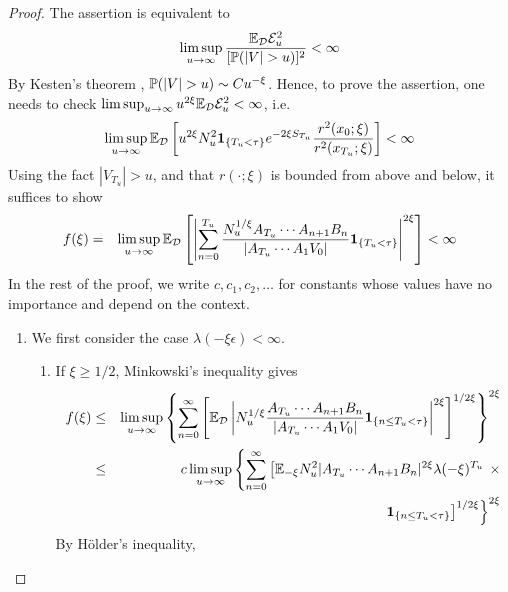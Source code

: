 \documentclass{article}
\theoremstyle{remark}
\begin{document}
\begin{proof}
  The assertion is equivalent to
  \[
  \limsup_{u \to \infty} {\E_{\mathcal D} \mathcal E_u^2 \over [\P(|V|
    > u)]^2} < \infty
  \]
  By Kesten's theorem \cite{Kesten1973}, $\P(|V| > u) \sim C
  u^{-\xi}$. Hence, to prove the assertion, one needs to check
  $\limsup_{u \to \infty} u^{2\xi}\E_{\mathcal D} \mathcal E_u^2 <
  \infty$, i.e.
  \[
  \limsup_{u \to \infty} \E_{\mathcal D}  \left[u^{2\xi}
    N_u^2 \1{T_u < \tau} e^{-2\xi S_{T_u}} {r^2(x_0; \xi)
      \over r^2(x_{T_u}; \xi)}\right] < \infty
 \]
 Using the fact $|V_{T_u}| > u$, and that $r(\cdot; \xi)$ is bounded
 from above and below, it suffices to show
 \begin{eqnarray}
   f(\xi) &=& \limsup_{u \to \infty} \E_{\mathcal D} \left[
     \left|
       \sum_{n=0}^{T_u}
       \frac{
         N_u^{1/\xi} A_{T_u} \cdots A_{n+1} B_n 
       }{
         |A_{T_u} \cdots A_1 V_0|
       }
       \1{T_u < \tau}
     \right|^{2 \xi}
   \right] < \infty \label{eq:efficiency_target}
 \end{eqnarray}
  In the rest of the proof, we write $c, c_1, c_2, \dots$ for
  constants whose values have no importance and depend on the
  context.
  \begin{enumerate}
  \item We first consider the case $\lambda(-\xi\epsilon) <
    \infty$.
    \begin{enumerate}
    \item If $\xi \geq 1/2$, Minkowski's inequality gives
      \begin{eqnarray}
        f(\xi) &\leq& \limsup_{u \to \infty}
        \left\{
          \sum_{n=0}^{\infty}
          \left[
            \E_{\mathcal D} \left|
              N_u^{1/\xi}
              \frac{
                A_{T_u} \cdots A_{n+1} B_n 
              }{
                |A_{T_u} \cdots A_1 V_0|
              }
              \1{n \leq T_u < \tau}
            \right|^{2 \xi}
          \right]^{1/2\xi}
        \right\}^{2\xi} \nonumber \\
        &\leq& c \limsup_{u \to \infty}
        \left\{
          \sum_{n=0}^{\infty}
          \left[
            \E_{-\xi} N_u^2 
            |A_{T_u} \cdots A_{n+1} B_n|^{2\xi}
            \lambda(-\xi)^{T_u} \right. \right.\times \nonumber \\
            &&   \left. \left.
            \1{n \leq T_u < \tau}
          \right]^{1/2\xi}
        \right\}^{2\xi} \label{eq:xi_above_half_prel}
      \end{eqnarray}
      By H\"older's inequality,

\end{enumerate}
\end{enumerate}
\end{proof}
\end{document}

